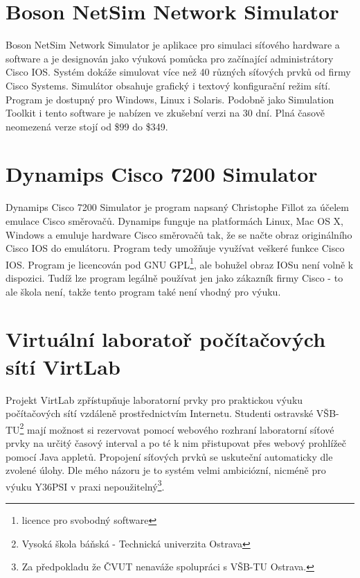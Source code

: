 \section{Boson NetSim Network Simulator} 
Boson NetSim Network Simulator \cite{reserse:boson} je aplikace pro simulaci síťového hardware a software a je designován jako výuková pomůcka pro začínající administrátory Cisco IOS. Systém dokáže simulovat více než 40 různých síťových prvků od firmy Cisco Systems. Simulátor obsahuje grafický i textový konfigurační režim sítí. Program je dostupný pro Windows, Linux i Solaris. Podobně jako Simulation Toolkit i tento software je nabízen ve zkušební verzi na 30 dní. Plná časově neomezená verze stojí od \$99 do \$349.


\section{Dynamips Cisco 7200 Simulator}
Dynamips Cisco 7200 Simulator \cite{reserse:dynamips} je program napsaný Christophe Fillot za účelem emulace Cisco směrovačů. Dynamips funguje na platformách Linux, Mac OS X, Windows a emuluje hardware Cisco směrovačů tak, že se načte obraz originálního Cisco IOS do emulátoru. Program tedy umožňuje využívat veškeré funkce Cisco IOS. Program je licencován pod GNU GPL\footnote{licence pro svobodný software}, ale bohužel obraz IOSu není volně k dispozici. Tudíž lze program legálně používat jen jako zákazník firmy Cisco - to ale škola není, takže tento program také není vhodný pro výuku.


\section{Virtuální laboratoř počítačových sítí VirtLab}
Projekt VirtLab \cite{reserse:virtlab} zpřístupňuje laboratorní prvky pro praktickou výuku počítačových sítí vzdáleně prostřednictvím Internetu. Studenti ostravské VŠB-TU\footnote{Vysoká škola báňská - Technická univerzita Ostrava} mají možnost si rezervovat pomocí webového rozhraní laboratorní síťové prvky na určitý časový interval a po té k nim přistupovat přes webový prohlížeč pomocí Java appletů. Propojení síťových prvků se uskuteční automaticky dle zvolené úlohy. Dle mého názoru je to systém velmi ambiciózní, nicméně pro výuku Y36PSI v praxi nepoužitelný\footnote{Za předpokladu že ČVUT nenaváže spolupráci s VŠB-TU Ostrava.}.




